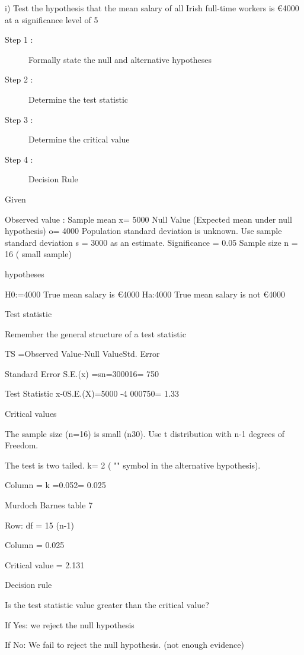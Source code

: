 \documentclass[12pt]{report}
\begin{document}
i)  Test the hypothesis that the mean salary of all Irish full-time workers is €4000 at a significance level of 5%


\begin{description}
\item[Step 1 :] Formally state the null and alternative hypotheses
\item[Step 2 :] Determine the test statistic
\item[Step 3 :] Determine the critical value
\item[Step 4 :] Decision Rule
\end{description}



Given

Observed value : Sample mean     x= 5000 
Null Value (Expected mean under null hypothesis)     o= 4000   
Population standard deviation is unknown.
Use sample standard deviation s = 3000 as an estimate.
Significance  = 0.05
Sample size n = 16  ( small sample)

hypotheses

H0:=4000    True mean salary is €4000
Ha:4000    True mean salary is  not €4000

Test statistic

Remember the general structure of a test statistic

TS =Observed Value-Null ValueStd. Error 



Standard Error		S.E.(x) =sn=300016= 750

Test Statistic		x-0S.E.(X)=5000 -4 000750= 1.33


Critical values

The sample size (n=16) is small (n30). Use t distribution with n-1 degrees of Freedom.


The test is two tailed.  k= 2  ( "" symbol in the alternative hypothesis).


Column = k =0.052= 0.025


Murdoch Barnes table 7


Row: df = 15         (n-1)

Column = 0.025

Critical value =  2.131 


Decision rule


Is the test statistic value greater than the critical value?

If Yes: we reject the null hypothesis

If No: We fail to reject the null hypothesis. (not enough evidence)
\end{document}
